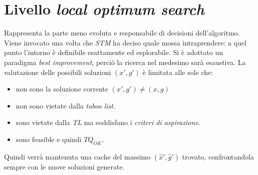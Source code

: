 \section{Livello \emph{local optimum search}}
Rappresenta la parte meno evoluta e responsabile di decisioni dell'algoritmo. Viene invocato una volta che \emph{STM} ha deciso quale mossa intraprendere: 
a quel punto l'intorno è definibile esattamente ed esplorabile. Si è adottato un paradigma \emph{best improvement}, perciò la ricerca nel medesimo sarà esaustiva.
La valutazione delle possibili soluzioni $(x\prime,g\prime)$ è limitata alle sole che:  
\begin{itemize}
  \item non sono la soluzione corrente $(x\prime,g\prime) \neq (x,g)$
  \item non sono vietate dalla \emph{taboo list}.
  \item sono vietate dalla \emph{TL} ma soddisfano i \emph{criteri di aspirazione}.
  \item sono feasible e quindi $TQ_{OK}$.
\end{itemize}
Quindi verrà mantenuta una cache del massimo $(\hat{x}\prime,\hat{g}\prime)$ trovato, confrontandola sempre con le nuove soluzioni generate.
